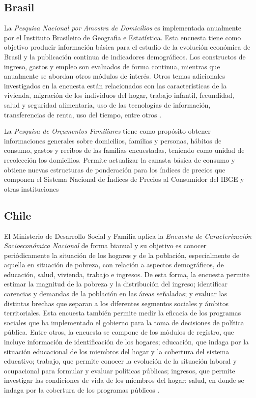 \documentclass[
  12pt,
]{book}
\begin{document}
\hypertarget{brasil}{%
\subsection{Brasil}\label{brasil}}

La \emph{Pesquisa Nacional por Amostra de Domicílios} es implementada anualmente por el Instituto Brasileiro de Geografia e Estatística. Esta encuesta tiene como objetivo producir información básica para el estudio de la evolución económica de Brasil y la publicación continua de indicadores demográficos. Los constructos de ingreso, gastos y empleo son evaluados de forma continua, mientras que anualmente se abordan otros módulos de interés. Otros temas adicionales investigados en la encuesta están relacionados con las características de la vivienda, migración de los individuos del hogar, trabajo infantil, fecundidad, salud y seguridad alimentaria, uso de las tecnologías de información, transferencias de renta, uso del tiempo, entre otros \citep{IBGEBR_2017}.

La \emph{Pesquisa de Orçamentos Familiares} tiene como propósito obtener informaciones generales sobre domicilios, familias y personas, hábitos de consumo, gastos y recibos de las familias encuestadas, teniendo como unidad de recolección los domicilios. Permite actualizar la canasta básica de consumo y obtiene nuevas estructuras de ponderación para los índices de precios que componen el Sistema Nacional de Índices de Precios al Consumidor del IBGE y otras instituciones \citep{IBGE-BR2018}

\hypertarget{chile}{%
\subsection{Chile}\label{chile}}

El Ministerio de Desarrollo Social y Familia aplica la \emph{Encuesta de Caracterización Socioeconómica Nacional} de forma bianual y su objetivo es conocer periódicamente la situación de los hogares y de la población, especialmente de aquella en situación de pobreza, con relación a aspectos demográficos, de educación, salud, vivienda, trabajo e ingresos. De esta forma, la encuesta permite estimar la magnitud de la pobreza y la distribución del ingreso; identificar carencias y demandas de la población en las áreas señaladas; y evaluar las distintas brechas que separan a los diferentes segmentos sociales y ámbitos territoriales. Esta encuesta también permite medir la eficacia de los programas sociales que ha implementado el gobierno para la toma de decisiones de política pública. Entre otros, la encuesta se compone de los módulos de registro, que incluye información de identificación de los hogares; educación, que indaga por la situación educacional de los miembros del hogar y la cobertura del sistema educativo; trabajo, que permite conocer la evolución de la situación laboral y ocupacional para formular y evaluar políticas públicas; ingresos, que permite investigar las condiciones de vida de los miembros del hogar; salud, en donde se indaga por la cobertura de los programas públicos \citep{MDS-CL_2015}.
\end{document}

